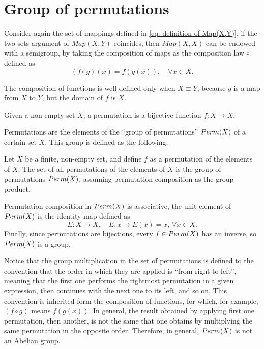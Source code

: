 \section{Group of permutations}
Consider again the set of mappings defined in \eqref{eq: definition of Map(X,Y)}, if the two sets argument of $Map(X,Y)$ coincides, then $Map(X,X)$ can be endowed with a semigroup, by taking the composition of maps as the composition law $\circ$ defined as
\begin{equation}
    (f \circ g)(x) = f(g(x)),\quad \forall x \in X.
\end{equation}
\begin{obs}
    The composition of functions is well-defined only when $X \equiv Y$, because $g$ is a map from $X$ to $Y$, but the domain of $f$ is $X$.
\end{obs}
\begin{defn}[permutation]
    Given a non-empty set $X$, a permutation is a bijective function $f : X \to X$.
\end{defn}
Permutations are the elements of the ``group of permutations'' ${Perm}(X)$ of a certain set $X$. This group is defined as the following. 
\begin{defn}
    Let $X$ be a finite, non-empty set, and define $f$ as a permutation of the elements of $X$. The set of all permutations of the elements of $X$ is the group of permutations ${Perm}(X)$, assuming permutation composition as the group product.
\end{defn}
Permutation composition in ${Perm}(X)$ is associative, the unit element of ${Perm}(X)$ is the identity map defined as
\begin{equation}
    E : X \to X,\quad E : x \mapsto E(x) = x,\, \forall x \in X.
\end{equation}
Finally, since permutations are bijections, every $f \in {Perm}(X)$ has an inverse, so ${Perm}(X)$ is a group. 
\begin{obs}
    Notice that the group multiplication in the set of permutations is defined to the convention that the order in which they are applied is ``from right to left'', meaning that the first one performs the rightmost permutation in a given expression, then continues with the next one to its left, and so on. This convention is inherited form the composition of functions, for which, for example, $(f \circ g)$ means $f(g(x))$. In general, the result obtained by applying first one permutation, then another, is not the same that one obtains by multiplying the same permutation in the opposite order. Therefore, in general, ${Perm}(X)$ is not an Abelian group.
\end{obs}

